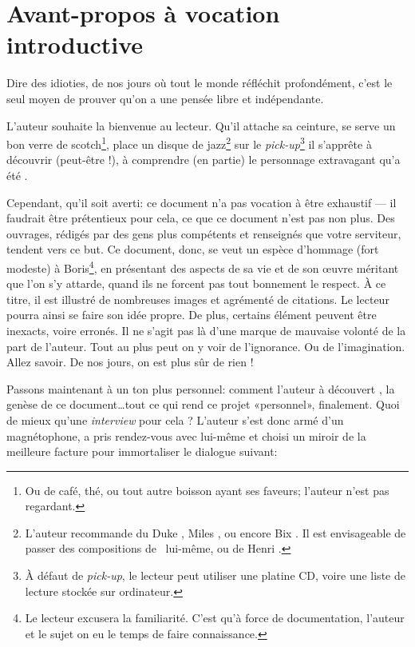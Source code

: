 \frontmatter
\chapter{Avant-propos à vocation introductive}
\epigraph{Dire des idioties, de nos jours où tout le monde réfléchit profondément, c'est le seul moyen de prouver qu'on a une pensée libre et indépendante.}{\BV}
\vfill
\pagebreak

L'auteur souhaite la bienvenue au lecteur. Qu'il attache sa ceinture,
se serve un bon verre de scotch\footnote{Ou de café, thé, ou tout autre
boisson ayant ses faveurs; l'auteur n'est pas regardant.}, place un
disque de jazz\footnote{L'auteur recommande du Duke , 
Miles , ou encore Bix . Il est envisageable de
passer des compositions de \BV\ lui-même, ou de Henri .}
sur le \emph{pick-up}\footnote{À défaut de \emph{pick-up},
le lecteur peut utiliser une platine CD, voire une liste de lecture
stockée sur ordinateur.}
il s'apprête à découvrir (peut-être !), à comprendre (en partie) le
personnage extravagant qu'a été \BV.

Cependant, qu'il soit averti: ce document n'a pas vocation à être exhaustif
--- il faudrait être prétentieux pour cela, ce que ce document n'est pas
non plus. Des ouvrages, rédigés par des gens plus compétents et renseignés
que votre serviteur, tendent vers ce but.
Ce document, donc, se veut un espèce d'hommage (fort modeste) à
Boris\footnote{Le lecteur excusera la familiarité. C'est qu'à force de
documentation, l'auteur et le sujet on eu le temps de faire connaissance.},
en présentant des aspects de sa vie et de son \oe{}uvre méritant
que l'on s'y attarde, quand ils ne forcent pas tout bonnement le respect.
À ce titre, il est illustré de nombreuses images et agrémenté
de citations. Le lecteur pourra ainsi se faire son idée propre. De plus, 
certains élément peuvent être inexacts, voire erronés. Il ne
s'agit pas là d'une marque de mauvaise volonté de la part de l'auteur. Tout
au plus peut on y voir de l'ignorance. Ou de l'imagination. Allez savoir.
De nos jours, on est plus sûr de rien !


Passons maintenant à un ton plus personnel: comment l'auteur à
 découvert \BV, la genèse de ce document\ldots tout ce qui rend ce projet «personnel», finalement.
Quoi de mieux qu'une \emph{interview} pour cela ?
L'auteur s'est donc armé d'un magnétophone, a pris rendez-vous avec lui-même
et choisi un miroir de la meilleure facture pour immortaliser le dialogue suivant:

